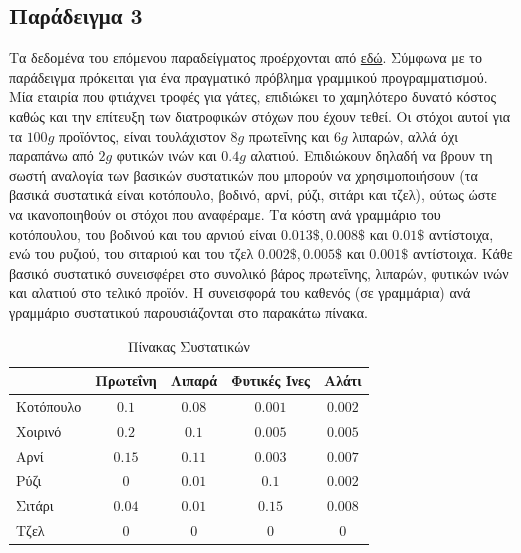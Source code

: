 \subsection{Παράδειγμα 3}
Τα δεδομένα του επόμενου παραδείγματος προέρχονται από
\href{http://pythonhosted.org/PuLP/CaseStudies/a_blending_problem.html}{εδώ}.
Σύμφωνα με το παράδειγμα πρόκειται για ένα πραγματικό πρόβλημα γραμμικού προγραμματισμού.
Μία εταιρία που φτιάχνει τροφές για γάτες, επιδιώκει το χαμηλότερο δυνατό κόστος καθώς
και την επίτευξη των διατροφικών στόχων που έχουν τεθεί. Οι στόχοι αυτοί για τα $100 g$
προϊόντος, είναι τουλάχιστον $8 g$ πρωτεΐνης και $6 g$ λιπαρών, αλλά όχι παραπάνω
από $2 g$ φυτικών ινών και $0.4 g$ αλατιού. Επιδιώκουν δηλαδή να βρουν τη σωστή
αναλογία των βασικών συστατικών που μπορούν να χρησιμοποιήσουν (τα βασικά συστατικά
είναι κοτόπουλο, βοδινό, αρνί, ρύζι, σιτάρι και τζελ), ούτως ώστε να ικανοποιηθούν
οι στόχοι που αναφέραμε. Τα κόστη ανά γραμμάριο του κοτόπουλου, του βοδινού και του
αρνιού είναι $0.013\$, 0.008\$$ και $0.01\$$ αντίστοιχα, ενώ του ρυζιού, του
σιταριού και του τζελ $0.002\$, 0.005\$$ και $0.001\$$ αντίστοιχα. Κάθε βασικό
συστατικό συνεισφέρει στο συνολικό βάρος πρωτεΐνης, λιπαρών, φυτικών ινών και αλατιού
στο τελικό προϊόν. Η συνεισφορά του καθενός (σε γραμμάρια) ανά γραμμάριο συστατικού
παρουσιάζονται στο παρακάτω πίνακα.
\begin{table}[h]
    \centering
    \begin{tabulary}{0.95\textwidth}{| p{2cm} | C | C | C | C |}
        \hline
        {}        & Πρωτεΐνη & Λιπαρά & Φυτικές Ίνες & Αλάτι \\ \hline
        Κοτόπουλο      & $0.1$             & $0.08$                    & $0.001$                   & $0.002$ \\ \hline
        Χοιρινό      & $0.2$            & $0.1$                    & $0.005$                 & $0.005$ \\ \hline
        Αρνί      & $0.15$            & $0.11$                    & $0.003$                 & $0.007$ \\ \hline
        Ρύζι      & $0$             & $0.01$                    & $0.1$                  & $0.002$ \\ \hline
        Σιτάρι      & $0.04$            & $0.01$                    & $0.15$                 & $0.008$  \\ \hline
        Τζελ     & $0$             & $0$                    & $0$                  & $0$ \\ \hline
    \end{tabulary}
    \caption{Πίνακας Συστατικών}\label{table:lp3}
\end{table}

